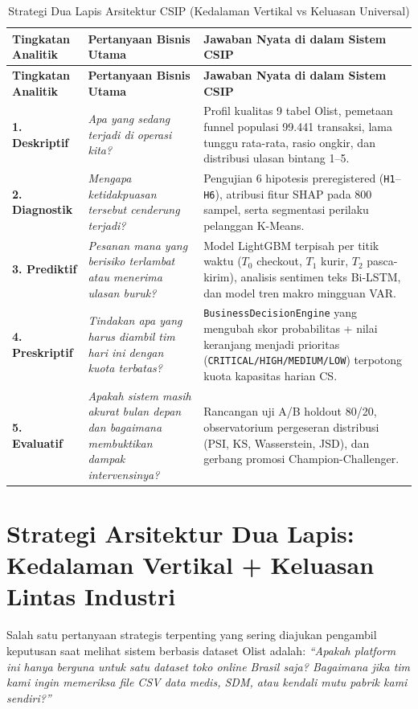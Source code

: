 \documentclass[11pt,a4paper,oneside]{book}
\newcommand{\code}[1]{{\small\nolinkurl{#1}}}
\begin{document}
\begin{longtable}{@{} >{\raggedright\arraybackslash}p{2.6cm} >{\raggedright\arraybackslash}p{4.8cm} >{\raggedright\arraybackslash}p{8.4cm} @{}}
\caption{Strategi Dua Lapis Arsitektur CSIP (Kedalaman Vertikal vs Keluasan Universal)} \\
\toprule
\textbf{Tingkatan Analitik} & \textbf{Pertanyaan Bisnis Utama} & \textbf{Jawaban Nyata di dalam Sistem CSIP} \\
\midrule
\endfirsthead
\toprule
\textbf{Tingkatan Analitik} & \textbf{Pertanyaan Bisnis Utama} & \textbf{Jawaban Nyata di dalam Sistem CSIP} \\
\midrule
\endhead
\bottomrule
\endfoot
\textbf{1. Deskriptif} & \emph{Apa yang sedang terjadi di operasi kita?} & Profil kualitas 9 tabel Olist, pemetaan funnel populasi 99.441 transaksi, lama tunggu rata-rata, rasio ongkir, dan distribusi ulasan bintang 1--5. \\
\textbf{2. Diagnostik} & \emph{Mengapa ketidakpuasan tersebut cenderung terjadi?} & Pengujian 6 hipotesis preregistered (\code{H1}--\code{H6}), atribusi fitur SHAP pada 800 sampel, serta segmentasi perilaku pelanggan K-Means. \\
\textbf{3. Prediktif} & \emph{Pesanan mana yang berisiko terlambat atau menerima ulasan buruk?} & Model LightGBM terpisah per titik waktu ($T_0$ checkout, $T_1$ kurir, $T_2$ pasca-kirim), analisis sentimen teks Bi-LSTM, dan model tren makro mingguan VAR. \\
\textbf{4. Preskriptif} & \emph{Tindakan apa yang harus diambil tim hari ini dengan kuota terbatas?} & \code{BusinessDecisionEngine} yang mengubah skor probabilitas + nilai keranjang menjadi prioritas (\code{CRITICAL/HIGH/MEDIUM/LOW}) terpotong kuota kapasitas harian CS. \\
\textbf{5. Evaluatif} & \emph{Apakah sistem masih akurat bulan depan dan bagaimana membuktikan dampak intervensinya?} & Rancangan uji A/B holdout 80/20, observatorium pergeseran distribusi (PSI, KS, Wasserstein, JSD), dan gerbang promosi Champion-Challenger. \\
\end{longtable}

\section{Strategi Arsitektur Dua Lapis: Kedalaman Vertikal + Keluasan Lintas Industri}

Salah satu pertanyaan strategis terpenting yang sering diajukan pengambil keputusan saat melihat sistem berbasis dataset Olist adalah: \emph{``Apakah platform ini hanya berguna untuk satu dataset toko online Brasil saja? Bagaimana jika tim kami ingin memeriksa file CSV data medis, SDM, atau kendali mutu pabrik kami sendiri?''}
\end{document}
